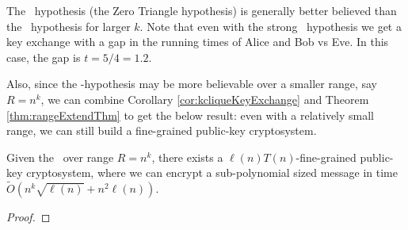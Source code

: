 The \zThclique~hypothesis (the Zero Triangle hypothesis) is generally better believed than the \zkclique~hypothesis for larger $k$. Note that even with the strong \zThclique~hypothesis we get a key exchange with a gap in the running times of Alice and Bob vs Eve. In this case, the gap is $t = 5/4 = 1.2$.

Also, since the \zkclique-hypothesis may be more believable over a smaller range, say $R = n^k$, we can combine Corollary \ref{cor:kcliqueKeyExchange} and Theorem \ref{thm:rangeExtendThm} to get the below result: even with a relatively small range, we can still build a fine-grained public-key cryptosystem.

\begin{corollary}
	Given the \strongzkc~over range $R = n^{k}$, there exists a $\ell(n)T(n)$-fine-grained public-key cryptosystem, where we can encrypt a sub-polynomial sized message in time $\tilde{O}\left(n^{k}\sqrt{\ell(n)} + n^2\ell(n)\right)$.
\end{corollary}
\begin{proof}
\end{proof}